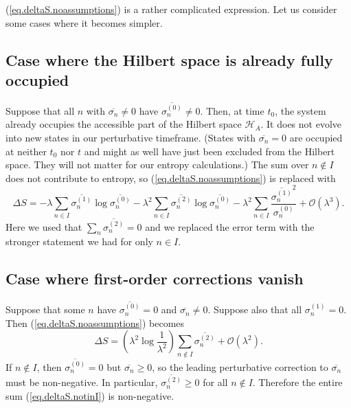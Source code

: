 \documentclass[11pt]{article}
\newcommand{\Od}[1]{\mathcal{O}{\left(#1\right)}}
\newcommand{\hilb}{\mathcal{H}}
\theoremstyle{theorem}
\theoremstyle{remark}
\theoremstyle{step}
\theoremstyle{gap}
\begin{document}
(\ref{eq.deltaS.noassumptions}) is a rather complicated expression. Let us consider some cases where it becomes simpler.

\subsection{Case where the Hilbert space is already fully occupied}\label{sec.all.sigma.nonzero}

Suppose that all \(n\) with \(\overline{\sigma_n} \neq 0\) have \(\overline{\sigma_n^{(0)}} \neq 0\).
Then, at time \(t_0\), the system already occupies the accessible part of the Hilbert space \(\hilb_A\). It does not evolve into new states in our perturbative timeframe. (States with \(\overline{\sigma_n} = 0\) are occupied at neither \(t_0\) nor \(t\) and might as well have just been excluded from the Hilbert space. They will not matter for our entropy calculations.) The sum over \(n \not\in I\) does not contribute to entropy, so (\ref{eq.deltaS.noassumptions}) is replaced with
\begin{equation}
\Delta S = 
-\lambda \sum_{n \in I}\overline{\sigma_n^{(1)}}\log\overline{\sigma_n^{(0)}}- \lambda^2 \sum_{n \in I}\overline{\sigma_n^{(2)}}\log\overline{\sigma_n^{(0)}} - \lambda^2 \sum_{n \in I}\frac{\overline{\sigma_n^{(1)}}^2}{\sigma_n^{(0)}}+ \Od{\lambda^{3}}.
\end{equation}
Here we used that \(\sum_{n}\overline{\sigma_n^{(2)}} = 0\) and we replaced the error term with the stronger statement we had for only \(n \in I\).

\subsection{Case where first-order corrections vanish}

Suppose that some \(n\) have \(\overline{\sigma_n^{(0)}} = 0\) and \(\overline{\sigma_n} \neq 0\). Suppose also that all \(\sigma_n^{(1)} = 0\). Then  (\ref{eq.deltaS.noassumptions}) becomes
\begin{equation}\label{eq.deltaS.notinI}
\Delta S = \left(\lambda^2\log\frac{1}{\lambda^{2}} \right)\sum_{n \not\in I} \overline{\sigma_n^{(2)}} + \Od{\lambda^2}.
\end{equation}
If \(n \not\in I\), then \(\overline{\sigma_n^{(0)}} = 0\) but \(\overline{\sigma_n}\geq 0\), so the leading perturbative correction to \(\overline{\sigma_n}\) must be non-negative. In particular, \(\overline{\sigma_n^{(2)}} \geq 0\) for all \(n \not\in I\). Therefore the entire sum (\ref{eq.deltaS.notinI}) is non-negative.
\end{document}
